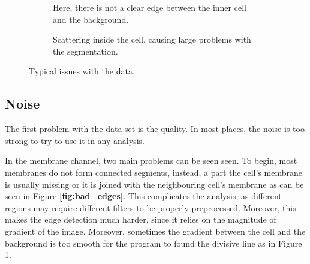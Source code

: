 \documentclass[
  digital,     %
  oneside,     %
  nosansbold,  %
  nocolorbold, %
  lof,         %
  lot,         %
]{fithesis4}
\begin{document}
\begin{figure}
\begin{subfigure}[t]{0.3\textwidth}
        \caption{Here, there is not a clear edge between the inner cell and the
        background.}
        \label{fig:bleeding_edges}
    \end{subfigure}
    \hfill
    \begin{subfigure}[t]{0.5\textwidth}
        \centering
        \caption{Scattering inside the cell, causing large problems with the
        segmentation.}
        \label{fig:scattering}
    \end{subfigure}
    \caption{Typical issues with the data.}
    \label{fig:labelling_example}
\end{figure}

\subsection{Noise}

The first problem with the data set is the quality. In most places, the noise is
too strong to try to use it in any analysis.

In the membrane channel, two main problems can be seen seen. To begin, most
membranes do not form connected segments, instead, a part the cell's membrane is
usually missing or it is joined with the neighbouring cell's membrane as can be
seen in Figure \textbf{\ref{fig:bad_edges}}. This complicates the analysis, as different
regions may require different filters to be properly preprocessed. Moreover,
this makes the edge detection much harder, since it relies on the magnitude of
gradient of the image. Moreover, sometimes the gradient between the cell and the
background is too smooth for the program to found the divisive line as in Figure
\ref{fig:bleeding_edges}.
\end{document}
